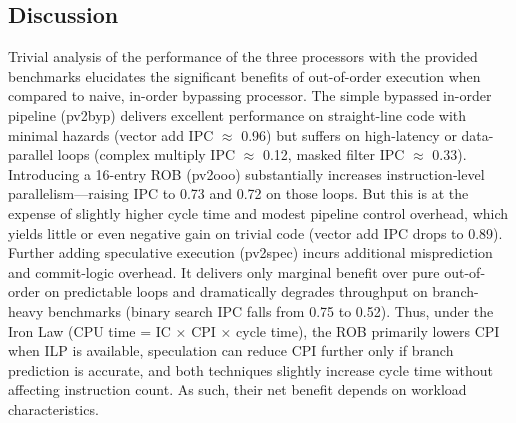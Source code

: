 \documentclass[11pt]{article}
\begin{document}
\subsection*{Discussion}


Trivial analysis of the performance of the three processors with the provided
benchmarks elucidates the significant benefits of out-of-order execution when
compared to naive, in-order bypassing processor. The simple bypassed in-order
pipeline (pv2byp) delivers excellent performance on straight-line code with
minimal hazards (vector add IPC $\approx$ 0.96) but suffers on high-latency or
data-parallel loops (complex multiply IPC $\approx$ 0.12, masked filter IPC $\approx$ 0.33).
Introducing a 16-entry ROB (pv2ooo) substantially increases instruction‐level
parallelism—raising IPC to 0.73 and 0.72 on those loops. But this is at the expense of
slightly higher cycle time and modest pipeline control overhead, which yields
little or even negative gain on trivial code (vector add IPC drops to 0.89).
Further adding speculative execution (pv2spec) incurs additional misprediction
and commit‐logic overhead. It delivers only marginal benefit over pure
out-of-order on predictable loops and dramatically degrades throughput on
branch-heavy benchmarks (binary search IPC falls from 0.75 to 0.52). Thus,
under the Iron Law (CPU time = IC × CPI × cycle time), the ROB primarily lowers
CPI when ILP is available, speculation can reduce CPI further only if branch
prediction is accurate, and both techniques slightly increase cycle time
without affecting instruction count. As such, their net benefit depends on workload
characteristics.


%
\end{document}
